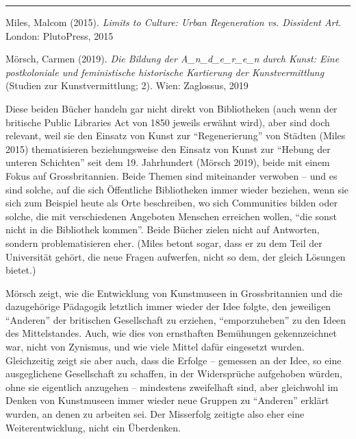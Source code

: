 \documentclass[a4paper,
fontsize=11pt,
oneside,
numbers=noperiodatend,
parskip=half-,
bibliography=totoc,
final
]{scrartcl}
\begin{document}
\begin{center}\rule{0.5\linewidth}{0.5pt}\end{center}

Miles, Malcom (2015). \emph{Limits to Culture: Urban Regeneration vs.
Dissident Art}. London: PlutoPress, 2015

Mörsch, Carmen (2019). \emph{Die Bildung der A\_n\_d\_e\_r\_e\_n durch
Kunst: Eine postkoloniale und feministische historische Kartierung der
Kunstvermittlung} (Studien zur Kunstvermittlung; 2). Wien: Zaglossus,
2019

Diese beiden Bücher handeln gar nicht direkt von Bibliotheken (auch wenn
der britische Public Libraries Act von 1850 jeweils erwähnt wird), aber
sind doch relevant, weil sie den Einsatz von Kunst zur
\enquote{Regenerierung} von Städten (Miles 2015) thematisieren
beziehungsweise den Einsatz von Kunst zur \enquote{Hebung der unteren
Schichten} seit dem 19. Jahrhundert (Mörsch 2019), beide mit einem Fokus
auf Grossbritannien. Beide Themen sind miteinander verwoben -- und es
sind solche, auf die sich Öffentliche Bibliotheken immer wieder
beziehen, wenn sie sich zum Beispiel heute als Orte beschreiben, wo sich
Communities bilden oder solche, die mit verschiedenen Angeboten Menschen
erreichen wollen, \enquote{die sonst nicht in die Bibliothek kommen}.
Beide Bücher zielen nicht auf Antworten, sondern problematisieren eher.
(Miles betont sogar, dass er zu dem Teil der Universität gehört, die
neue Fragen aufwerfen, nicht so dem, der gleich Lösungen bietet.)

Mörsch zeigt, wie die Entwicklung von Kunstmuseen in Grossbritannien und
die dazugehörige Pädagogik letztlich immer wieder der Idee folgte, den
jeweiligen \enquote{Anderen} der britischen Gesellschaft zu erziehen,
\enquote{emporzuheben} zu den Ideen des Mittelstandes. Auch, wie dies
von ernsthaften Bemühungen gekennzeichnet war, nicht von Zynismus, und
wie viele Mittel dafür eingesetzt wurden. Gleichzeitig zeigt sie aber
auch, dass die Erfolge -- gemessen an der Idee, so eine ausgeglichene
Gesellschaft zu schaffen, in der Widersprüche aufgehoben würden, ohne
sie eigentlich anzugehen -- mindestens zweifelhaft sind, aber gleichwohl
im Denken von Kunstmuseen immer wieder neue Gruppen zu \enquote{Anderen}
erklärt wurden, an denen zu arbeiten sei. Der Misserfolg zeitigte also
eher eine Weiterentwicklung, nicht ein Überdenken.
\end{document}
